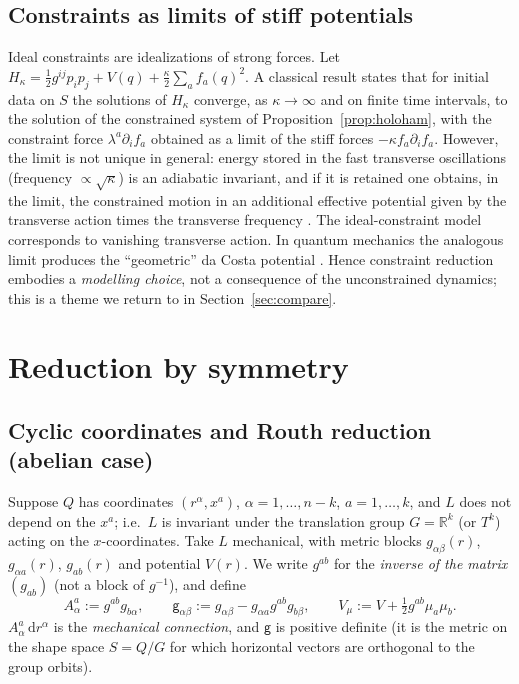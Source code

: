 \documentclass[11pt,a4paper]{article}
\numberwithin{equation}{section}
\theoremstyle{plain}
\theoremstyle{definition}
\theoremstyle{remark}
\newcommand{\R}{\mathbb{R}}
\newcommand{\dd}{\mathrm{d}}
\newcommand{\inv}{^{-1}}
\begin{document}
\subsection{Constraints as limits of stiff potentials}\label{sec:stiff}

Ideal constraints are idealizations of strong forces. Let $H_\kappa=\tfrac12 g^{ij}p_ip_j+V(q)+\tfrac\kappa2\sum_af_a(q)^2$. A classical result \cite{rubin1957} states that for initial data on $S$ the solutions of $H_\kappa$ converge, as $\kappa\to\infty$ and on finite time intervals, to the solution of the constrained system of Proposition~\ref{prop:holoham}, with the constraint force $\lambda^a\partial_if_a$ obtained as a limit of the stiff forces $-\kappa f_a\partial_if_a$. However, the limit is not unique in general: energy stored in the fast transverse oscillations (frequency $\propto\sqrt\kappa$) is an adiabatic invariant, and if it is retained one obtains, in the limit, the constrained motion in an additional effective potential given by the transverse action times the transverse frequency \cite{takens1980,vankampen1984,bornemann1997}. The ideal-constraint model corresponds to vanishing transverse action. In quantum mechanics the analogous limit produces the ``geometric'' da Costa potential \cite{dacosta1981}. Hence constraint reduction embodies a \emph{modelling choice}, not a consequence of the unconstrained dynamics; this is a theme we return to in Section~\ref{sec:compare}.

\section{Reduction by symmetry}\label{sec:symmetry}

\subsection{Cyclic coordinates and Routh reduction (abelian case)}\label{sec:routh}

Suppose $Q$ has coordinates $(r^\alpha,x^a)$, $\alpha=1,\dots,n-k$, $a=1,\dots,k$, and $L$ does not depend on the $x^a$; i.e.\ $L$ is invariant under the translation group $G=\R^k$ (or $T^k$) acting on the $x$-coordinates. Take $L$ mechanical, with metric blocks $g_{\alpha\beta}(r)$, $g_{\alpha a}(r)$, $g_{ab}(r)$ and potential $V(r)$. We write $g^{ab}$ for the \emph{inverse of the matrix} $(g_{ab})$ (not a block of $g\inv$), and define
\begin{equation}\label{eq:routhdata}
A^a_\alpha:=g^{ab}g_{b\alpha},\qquad
\mathsf g_{\alpha\beta}:=g_{\alpha\beta}-g_{\alpha a}g^{ab}g_{b\beta},\qquad
V_\mu:=V+\tfrac12g^{ab}\mu_a\mu_b .
\end{equation}
$A^a_\alpha\,\dd r^\alpha$ is the \emph{mechanical connection}, and $\mathsf g$ is positive definite (it is the metric on the shape space $S=Q/G$ for which horizontal vectors are orthogonal to the group orbits).
\end{document}
